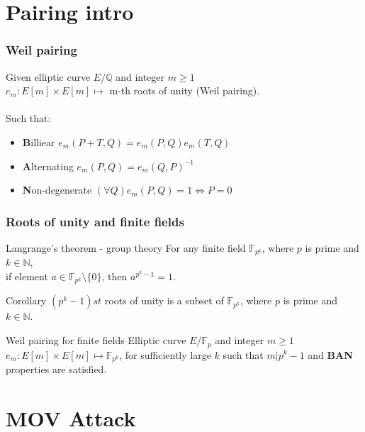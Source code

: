 \documentclass{beamer}
\begin{document}
\section{Pairing intro}
\begin{frame}
\frametitle{Weil pairing}
Given elliptic curve $E/\mathbb{Q}$ and integer $m \geq 1$ \\
$e_m: E[m] \times E[m] \mapsto$ m-th roots of unity (Weil pairing). \\ ~ \\
Such that:
\begin{itemize}
    \item \textbf{B}illiear $e_m(P+T,Q) = e_m(P,Q)  e_m(T,Q)$ \pause 
    \item \textbf{A}lternating $e_m(P,Q) = e_m(Q,P)^{-1}$ \pause 
    \item \textbf{N}on-degenerate $(\forall Q) e_m(P, Q) = 1 \iff P = 0$
\end{itemize}
\end{frame}

\begin{frame}
\frametitle{Roots of unity and finite fields}

\begin{block}{Langrange's theorem - group theory}
For any finite field $\mathbb{F}_{p^k}$, where $p$ is prime and $k \in \mathbb{N}$,\\
if element $a \in \mathbb{F}_{p^k} \setminus \{0\}$, then $a^{p^k - 1} = 1$.
\end{block} \pause

\begin{block}{Corollary}
$(p^k - 1)st$ roots of unity is a subset of $\mathbb{F}_{p^k}$, where $p$ is prime and $k \in \mathbb{N}$.
\end{block} \pause

\begin{block}{Weil pairing for finite fields}
Elliptic curve $E / \mathbb{F}_p$ and integer $m \geq 1$ \\
$e_m: E[m] \times E[m] \mapsto \mathbb{F}_{p^k}$, for sufficiently large $k$ such that $m | p^k-1$ and \textbf{BAN} properties are satisfied.
\end{block}
\end{frame}
\section{MOV Attack}
\end{document}
